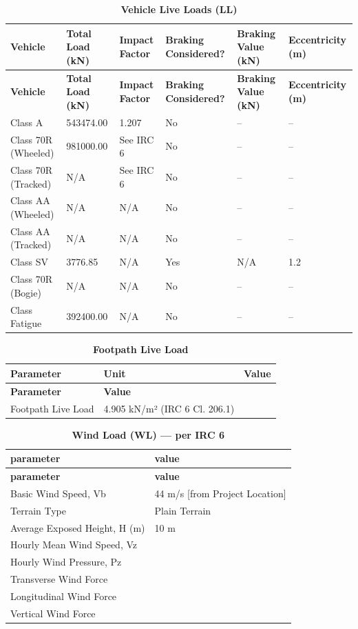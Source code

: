 \documentclass[12pt,a4paper]{report}
\numberwithin{table}{chapter}
\numberwithin{figure}{chapter}
\begin{document}
\begin{longtable}{|L{3.0cm}|L{2.8cm}|L{2.5cm}|L{2.2cm}|L{2.5cm}|L{2.5cm}|}
\caption{\textbf{Vehicle Live Loads (LL)}}
\hline
\textbf{Vehicle} & \textbf{Total Load (kN)} & \textbf{Impact Factor} & \textbf{Braking Considered?} & \textbf{Braking Value (kN)} & \textbf{Eccentricity (m)} \\
\hline
\endfirsthead
\hline
\textbf{Vehicle} & \textbf{Total Load (kN)} & \textbf{Impact Factor} & \textbf{Braking Considered?} & \textbf{Braking Value (kN)} & \textbf{Eccentricity (m)} \\
\hline
\endhead
Class A & 543474.00 & 1.207 & No & -- & -- \\
\hline
Class 70R (Wheeled) & 981000.00 & See IRC 6 & No & -- & -- \\
\hline
Class 70R (Tracked) & N/A & See IRC 6 & No & -- & -- \\
\hline
Class AA (Wheeled) & N/A & N/A & No & -- & -- \\
\hline
Class AA (Tracked) & N/A & N/A & No & -- & -- \\
\hline
Class SV & 3776.85 & N/A & Yes & N/A & 1.2 \\
\hline
Class 70R (Bogie) & N/A & N/A & No & -- & -- \\
\hline
Class Fatigue & 392400.00 & N/A & No & -- & -- \\
\hline
\end{longtable}

\begin{longtable}{|L{5.5cm}|L{3.0cm}|L{4.0cm}|}
\caption{\textbf{Footpath Live Load}}
\hline
\textbf{Parameter} & \textbf{Unit} & \textbf{Value} \\
\hline
\endfirsthead
\hline
\textbf{Parameter} & \textbf{Value} \\
\hline
\endhead
\textnormal{Footpath Live Load} & 4.905 kN/m² (IRC 6 Cl. 206.1) \\[6pt]
\hline
\end{longtable}
\vspace{1em}
\begin{longtable}{|L{5.5cm}|p{10.0cm}|}
\caption{\textbf{Wind Load (WL) --- per IRC 6}}
\hline
\textbf{parameter} & \textbf{value} \\
\hline
\endfirsthead
\hline
\textbf{parameter} & \textbf{value} \\
\hline
\endhead
\textnormal{Basic Wind Speed, Vb} & 44 m/s [from Project Location] \\[6pt]
\hline
\textnormal{Terrain Type} & Plain Terrain \\[6pt]
\hline
\textnormal{Average Exposed Height, H (m)} & 10 m \\[6pt]
\hline
\textnormal{Hourly Mean Wind Speed, Vz} &  \\[6pt]
\hline
\textnormal{Hourly Wind Pressure, Pz} &  \\[6pt]
\hline
\textnormal{Transverse Wind Force} &  \\[6pt]
\hline
\textnormal{Longitudinal Wind Force} &  \\[6pt]
\hline
\textnormal{Vertical Wind Force} &  \\[6pt]
\hline
\end{longtable}
\end{document}
